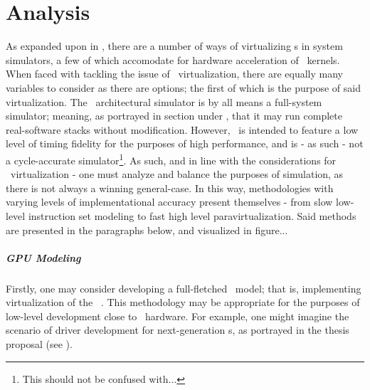 

\chapter{Analysis}
\label{cha:analysis}
As expanded upon in , there are a number of ways of virtualizing \dvttermgpu s in system simulators, a few of which accomodate for hardware acceleration of \dvttermgpu\ kernels.
When faced with tackling the issue of \dvttermgpu\ virtualization, there are equally many variables to consider as there are options; the first of which is the purpose of said virtualization.
The \dvttermsimics\ architectural simulator is by all means a full-system simulator; meaning, as portrayed in section  under , that it may run complete real-software stacks without modification.
However, \dvttermsimics\ is intended to feature a low level of timing fidelity for the purposes of high performance, and is - as such - not a cycle-accurate simulator\footnote{This should not be confused with...}.
As such, and in line with the considerations for \dvttermgpu\ virtualization - one must analyze and balance the purposes of simulation, as there is not always a winning general-case.
In this way, methodologies with varying levels of implementational accuracy present themselves - from slow low-level instruction set modeling to fast high level paravirtualization.
Said methods are presented in the paragraphs below, and visualized in figure...

\paragraph{GPU Modeling}
\label{par:analysis_gpumodeling}
Firstly, one may consider developing a full-fletched \dvttermgpu\ model; that is, implementing virtualization of the \dvttermgpu\ \dvttermisa .
This methodology may be appropriate for the purposes of low-level development close to \dvttermgpu\ hardware.
For example, one might imagine the scenario of driver development for next-generation \dvttermgpu s, as portrayed in the thesis proposal (see ).

